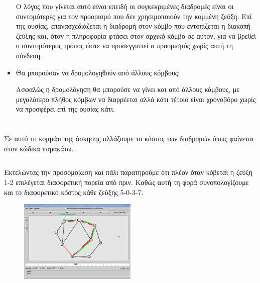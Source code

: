 \documentclass[a4paper,9pt]{article}
\begin{document}
\begin{itemize}
        Ο λόγος που γίνεται αυτό είναι επειδή οι συγκεκριμένες διαδρομές είναι οι
        συντομότερες για τον προορισμό που δεν χρησιμοποιούν την κομμένη ζεύξη. Επί
        της ουσίας, επανασχεδιάζεται η διαδρομή στον κόμβο που εντοπίζεται η διακοπή
        ζεύξης και, όταν η πληροφορία φτάσει στον αρχικό κόμβο σε αυτόν, για να βρεθεί
        ο συντομότερος τρόπος ώστε να προσεγγιστεί ο προορισμός χωρίς αυτή τη σύνδεση.
    \item Θα μπορούσαν να δρομολογηθούν από άλλους κόμβους;

        Ασφαλώς η δρομολόγηση θα μπορούσε να γίνει και από άλλους κόμβους, με
        μεγαλύτερο πλήθος κόμβων να διαρρέεται αλλά κάτι τέτοιο είναι χρονοβόρο χωρίς
        να προσφέρει επί της ουσίας κάτι.
\end{itemize}


\section{}
Σε αυτό το κομμάτι της άσκησης αλλάζουμε το κόστος των διαδρομών όπως φαίνεται
στον κώδικα παρακάτω.

\inputminted[fontsize=\scriptsize]{tcl}{files/ex3_3.tcl}

Εκτελώντας την προσομοίωση και πάλι παρατηρούμε ότι πλέον όταν κόβεται η ζεύξη
1-2 επιλέγεται διαφορετική πορεία από πριν. Καθώς  αυτή τη φορά
συνοπολογίζουμε και το διαφορετικό κόστος κάθε ζεύξης 5-0-3-7.

\begin{figure}[h]
    \centering
    \includegraphics[width=0.5\textwidth]{files/8.png}
\end{figure}
\end{document}
